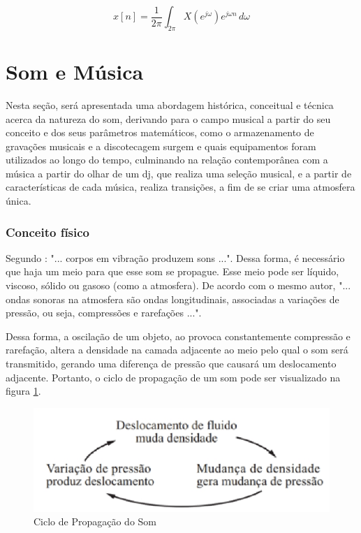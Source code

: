 \begin{equation}  \label{eq:04}
x[n]=\frac{1}{2\pi} \int_{2\pi}^{} X(e^{j\omega})e^{j\omega n} \,d\omega
\end{equation}



\newpage
\section{Som e Música}
Nesta seção, será apresentada uma abordagem histórica, conceitual e técnica acerca da natureza do som, derivando para o campo musical a partir do seu conceito e dos seus parâmetros matemáticos, como o armazenamento de gravações musicais e a discotecagem surgem e quais equipamentos foram utilizados ao longo do tempo, culminando na relação contemporânea com a música a partir do olhar de um dj, que realiza uma seleção musical, e a partir de características de cada música, realiza transições, a fim de se criar uma atmosfera única.

\subsubsection{Conceito físico}
Segundo \cite{moyses}: "... corpos em vibração produzem sons ...". Dessa forma, é necessário que haja um meio para que esse som se propague. Esse meio pode ser líquido, viscoso, sólido ou gasoso (como a atmosfera). De acordo com o mesmo autor, "... ondas sonoras na atmosfera são ondas longitudinais, associadas a variações de pressão, ou seja, compressões e rarefações ...". \par Dessa forma, a oscilação de um objeto, ao provoca constantemente compressão e rarefação, altera a densidade na camada adjacente ao meio pelo qual o som será transmitido, gerando uma diferença de pressão que causará um deslocamento adjacente. Portanto, o ciclo de propagação de um som pode ser visualizado na figura \ref{fig07}.

\begin{figure}[h]
	\centering
    \includegraphics[scale=0.7]{figuras/fig07.eps}
	\caption{Ciclo de Propagação do Som}
	\label{fig07}
\end{figure}

